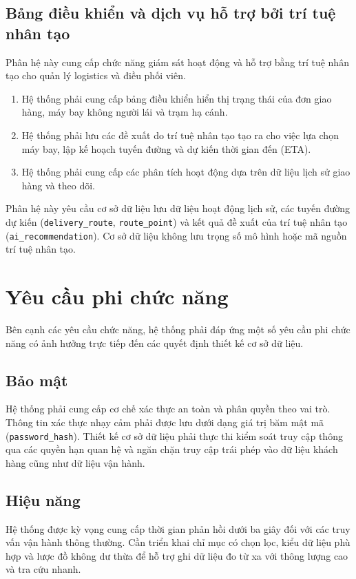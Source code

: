 \subsection{Bảng điều khiển và dịch vụ hỗ trợ bởi trí tuệ nhân tạo}

Phân hệ này cung cấp chức năng giám sát hoạt động và hỗ trợ bằng trí tuệ nhân tạo cho quản lý logistics và điều phối viên.
\begin{enumerate}
    \item Hệ thống phải cung cấp bảng điều khiển hiển thị trạng thái của đơn giao hàng, máy bay không người lái và trạm hạ cánh.
    \item Hệ thống phải lưu các đề xuất do trí tuệ nhân tạo tạo ra cho việc lựa chọn máy bay, lập kế hoạch tuyến đường và dự kiến thời gian đến (ETA).
    \item Hệ thống phải cung cấp các phân tích hoạt động dựa trên dữ liệu lịch sử giao hàng và theo dõi.
\end{enumerate}
Phân hệ này yêu cầu cơ sở dữ liệu lưu dữ liệu hoạt động lịch sử, các tuyến đường dự kiến (\texttt{delivery\_route}, \texttt{route\_point}) và kết quả đề xuất của trí tuệ nhân tạo (\texttt{ai\_recommendation}). Cơ sở dữ liệu không lưu trọng số mô hình hoặc mã nguồn trí tuệ nhân tạo.

\section{Yêu cầu phi chức năng}\label{s:nonfunctional}

Bên cạnh các yêu cầu chức năng, hệ thống phải đáp ứng một số yêu cầu phi chức năng có ảnh hưởng trực tiếp đến các quyết định thiết kế cơ sở dữ liệu.

\subsection{Bảo mật}
Hệ thống phải cung cấp cơ chế xác thực an toàn và phân quyền theo vai trò. Thông tin xác thực nhạy cảm phải được lưu dưới dạng giá trị băm mật mã (\texttt{password\_hash}). Thiết kế cơ sở dữ liệu phải thực thi kiểm soát truy cập thông qua các quyền hạn quan hệ và ngăn chặn truy cập trái phép vào dữ liệu khách hàng cũng như dữ liệu vận hành.

\subsection{Hiệu năng}
Hệ thống được kỳ vọng cung cấp thời gian phản hồi dưới ba giây đối với các truy vấn vận hành thông thường. Cần triển khai chỉ mục có chọn lọc, kiểu dữ liệu phù hợp và lược đồ không dư thừa để hỗ trợ ghi dữ liệu đo từ xa với thông lượng cao và tra cứu nhanh.

